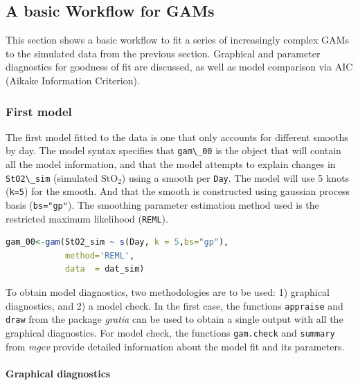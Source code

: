 \documentclass[
]{article}
\newcommand{\passthrough}[1]{#1}
\begin{document}
\hypertarget{a-basic-workflow-for-gams}{%
\subsection{A basic Workflow for GAMs}\label{a-basic-workflow-for-gams}}

This section shows a basic workflow to fit a series of increasingly complex GAMs to the simulated data from the previous section. Graphical and parameter diagnostics for goodness of fit are discussed, as well as model comparison via AIC (Aikake Information Criterion).

\hypertarget{first-model}{%
\subsubsection{First model}\label{first-model}}

The first model fitted to the data is one that only accounts for different smooths by day. The model syntax specifies that \passthrough{\lstinline!gam\_00!} is the object that will contain all the model information, and that the model attempts to explain changes in \passthrough{\lstinline!StO2\_sim!} (simulated \(\mbox{StO}_2\)) using a smooth per \passthrough{\lstinline!Day!}. The model will use 5 knots (\passthrough{\lstinline!k=5!}) for the smooth. And that the smooth is constructed using gaussian process basis (\passthrough{\lstinline!bs="gp"!}). The smoothing parameter estimation method used is the restricted maximum likelihood (\passthrough{\lstinline!REML!}).

\begin{lstlisting}[language=R]
gam_00<-gam(StO2_sim ~ s(Day, k = 5,bs="gp"),
            method='REML',
            data  = dat_sim)
\end{lstlisting}

To obtain model diagnostics, two methodologies are to be used: 1) graphical diagnostics, and 2) a model check. In the first case, the functions \passthrough{\lstinline!appraise!} and \passthrough{\lstinline!draw!} from the package \emph{gratia} can be used to obtain a single output with all the graphical diagnostics. For model check, the functions \passthrough{\lstinline!gam.check!} and \passthrough{\lstinline!summary!} from \emph{mgcv} provide detailed information about the model fit and its parameters.



\hypertarget{graphical-diagnostics}{%
\paragraph{Graphical diagnostics}\label{graphical-diagnostics}}
\end{document}
